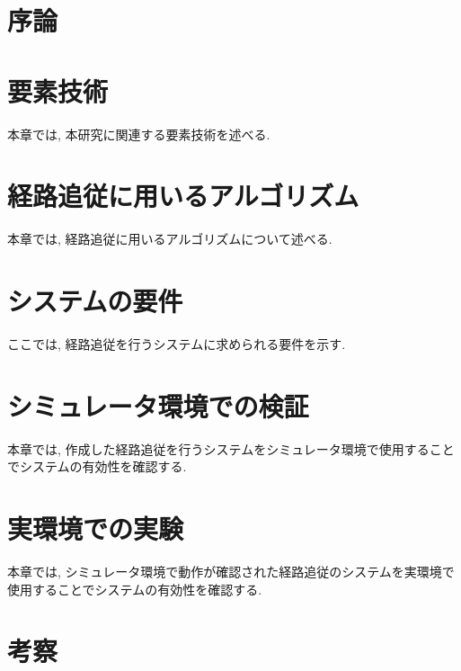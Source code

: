 \chapter{序論}
\label{chap:introduction}
%
%
%

\chapter{要素技術}
本章では, 本研究に関連する要素技術を述べる.

\chapter{経路追従に用いるアルゴリズム}
本章では, 経路追従に用いるアルゴリズムについて述べる.

\chapter{システムの要件}
ここでは, 経路追従を行うシステムに求められる要件を示す.

\chapter{シミュレータ環境での検証}
本章では, 作成した経路追従を行うシステムをシミュレータ環境で使用することでシステムの有効性を確認する.

\chapter{実環境での実験}
本章では, シミュレータ環境で動作が確認された経路追従のシステムを実環境で使用することでシステムの有効性を確認する.

\chapter{考察}
